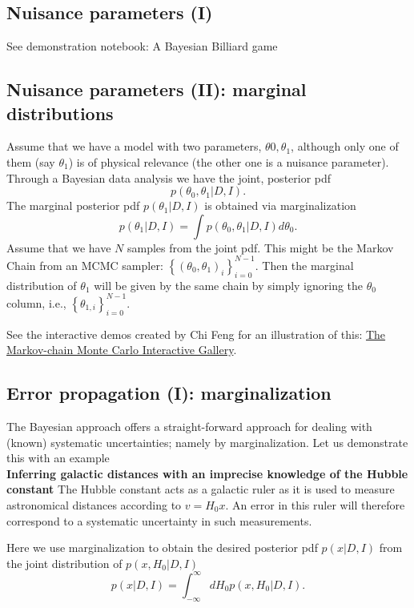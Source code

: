 \documentclass[%
oneside,                 %
final,                   %
10pt]{article}
\begin{document}
\subsection{Nuisance parameters (I)}
See demonstration notebook: A Bayesian Billiard game

\subsection{Nuisance parameters (II): marginal distributions}
Assume that we have a model with two parameters, $\theta0,\theta_1$, although only one of them (say $\theta_1$) is of physical relevance (the other one is a nuisance parameter). Through a Bayesian data analysis we have the joint, posterior pdf
\[
p(\theta_0, \theta_1 | D, I).
\]
The marginal posterior pdf $p(\theta_1 | D, I)$ is obtained via marginalization
\[
p(\theta_1 | D, I) = \int p(\theta_0, \theta_1 | D, I) d\theta_0.
\]
Assume that we have $N$ samples from the joint pdf. This might be the Markov Chain from an MCMC sampler: $\left\{ (\theta_0, \theta_1)_i \right\}_{i=0}^{N-1}$. Then the marginal distribution of $\theta_1$ will be given by the same chain by simply ignoring the $\theta_0$ column, i.e., $\left\{ \theta_{1,i} \right\}_{i=0}^{N-1}$. 

See the interactive demos created by Chi Feng for an illustration of this: \href{{https://chi-feng.github.io/mcmc-demo/}}{The Markov-chain Monte Carlo Interactive Gallery}.

\subsection{Error propagation (I): marginalization}
The Bayesian approach offers a straight-forward approach for dealing with (known) systematic uncertainties; namely by marginalization. Let us demonstrate this with an example \\

\textbf{Inferring galactic distances with an imprecise knowledge of the Hubble constant}
The Hubble constant acts as a galactic ruler as it is used to measure astronomical distances according to $v = H_0 x$. An error in this ruler will therefore correspond to a systematic uncertainty in such measurements.

Here we use marginalization to obtain the desired posterior pdf $p(x|D,I)$ from the joint distribution of $p(x,H_0|D,I)$
\[
p(x|D,I) = \int_{-\infty}^\infty dH_0 p(x,H_0|D,I).
\]
\end{document}
